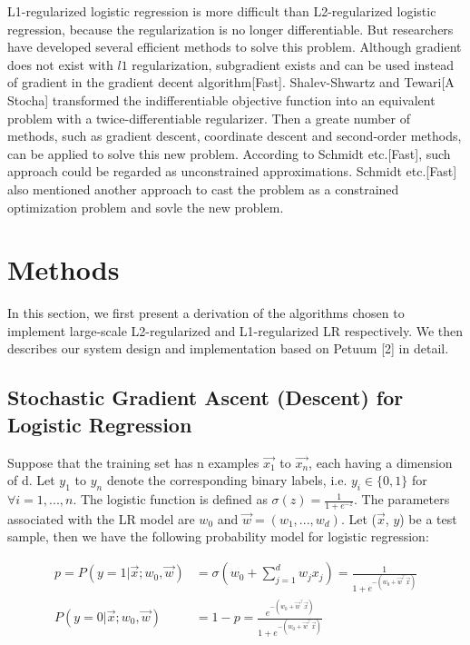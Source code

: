 \documentclass{article} %
\begin{document}
L1-regularized logistic regression is more difficult than L2-regularized logistic regression, because the regularization is no longer differentiable. But researchers have developed several efficient methods to solve this problem. Although gradient does not exist with $l1$ regularization, subgradient exists and can be used instead of gradient in the gradient decent algorithm[Fast]. Shalev-Shwartz and Tewari[A Stocha] transformed the indifferentiable objective function into an equivalent problem with a twice-differentiable regularizer. Then a greate number of methods, such as gradient descent, coordinate descent and second-order methods, can be applied to solve this new problem. According to Schmidt etc.[Fast], such approach could be regarded as unconstrained approximations. Schmidt etc.[Fast] also mentioned another approach to cast the problem as a constrained optimization problem and sovle the new problem.

\section{Methods}
\label{headings}

In this section, we first present a derivation of the algorithms chosen to implement large-scale L2-regularized and L1-regularized LR respectively. We then describes our system design and implementation based on Petuum [2] in detail.

\subsection{Stochastic Gradient Ascent (Descent) for Logistic Regression}

Suppose that the training set has n examples $\vec{x_1}$ to $\vec{x_n}$, each having a dimension of d. Let $y_1$ to $y_n$ denote the corresponding binary labels, i.e. $y_i \in \{0, 1\}$ for $\forall i = 1, ..., n$. The logistic function is defined as $\sigma(z) = \frac{1}{1+e^{-z}}$. The parameters associated with the LR model are $w_0$ and $\vec{w} = (w_1, ..., w_d)$. Let ($\vec{x}$, $y$) be a test sample, then we have the following probability model for logistic regression:

\begin{align*}
    p = P(y=1 | \vec{x}; w_0, \vec{w}) &= \sigma(w_0 + \sum\limits_{j=1}^d w_jx_j) = \frac{1}{1 + e^{-(w_0 + \vec{w}^\top\vec{x})}}\\
    P(y=0 | \vec{x}; w_0, \vec{w}) &= 1 - p = \frac{e^{-(w_0 + \vec{w}^\top\vec{x})}}{1 + e^{-(w_0 + \vec{w}^\top\vec{x})}}
\end{align*}
\end{document}
